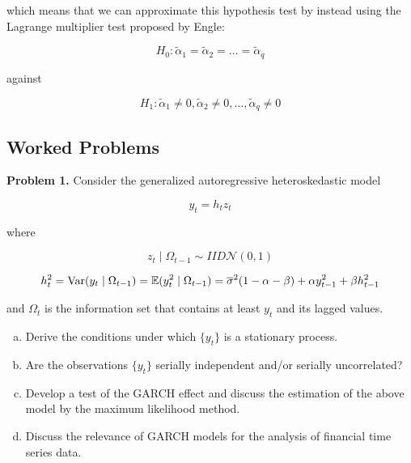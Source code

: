which means that we can approximate this hypothesis test by instead using the Lagrange multiplier test proposed by Engle:

\[
H_0: \tilde{\alpha}_1 = \tilde{\alpha}_2 = \ldots = \tilde{\alpha}_q
\]

against

\[
H_1: \tilde{\alpha}_1 \neq 0, \tilde{\alpha}_2 \neq 0, \ldots, \tilde{\alpha}_q \neq 0
\]


\subsection{Worked Problems}


\textbf{Problem 1.} Consider the generalized autoregressive heteroskedastic model 

\[
y_t = h_t z_t
\]

where

\begin{equation}\label{ts.hw6.eq1.1}
z_t \mid \Omega_{t-1} \sim IID\mathcal{N}(0,1)
\end{equation}

\begin{equation}\label{ts.hw6.eq1.2}
h_t^2 = \mathrm{Var}(y_t \mid \Omega_{t-1}) = \mathbb{E}(y_t^2 \mid \Omega_{t-1}) = \overline{\sigma}^2(1 - \alpha - \beta) + \alpha y_{t-1}^2 + \beta h_{t-1}^2 
\end{equation}

and \(\Omega_t\) is the information set that contains at least \(y_t\) and its lagged values.

\begin{enumerate}[(a)]

\item Derive the conditions under which \(\{y_t\}\) is a stationary process.

\item Are the observations \(\{y_t\}\) serially independent and/or serially uncorrelated?

\item Develop a test of the GARCH effect and discuss the estimation of the above model by the maximum likelihood method.

\item Discuss the relevance of GARCH models for the analysis of financial time series data.

\end{enumerate}

